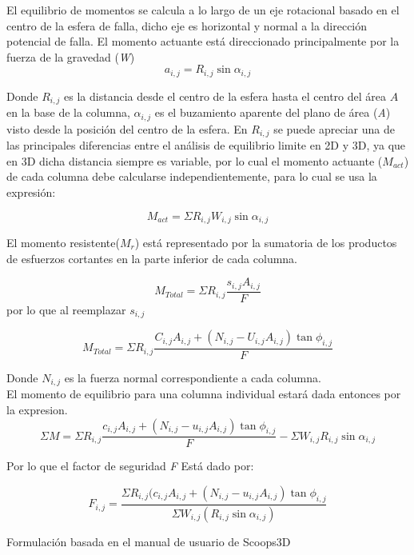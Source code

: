 El equilibrio de momentos se calcula a lo largo de un eje rotacional basado en el centro de la esfera de falla, dicho eje es horizontal y normal a la direcci\'on potencial de falla.
El momento actuante est\'a direccionado principalmente por la fuerza de la gravedad (\textit{W})
$$a_{i,j}=R_{i,j}\sin \alpha_{i,j}$$ 

Donde $\textit{R}_{i,j}$ es la distancia desde el centro de la esfera hasta el centro del \'area $\textit{A}$ en la base de la columna, $\alpha_{i,j}$ es el buzamiento aparente del plano de \'area (\textit{A}) visto desde la posici\'on del centro de la esfera. En $\textit{R}_{i,j}$ se puede apreciar una de las principales diferencias entre el an\'alisis de equilibrio limite en 2D y 3D, ya que en 3D dicha distancia siempre es variable, por lo cual el momento actuante ($\textit{M}_{act}$) de cada columna debe calcularse independientemente, para lo cual se usa la expresi\'on:

$$\textit{M}_{act}=\Sigma \textit{R}_{i,j}\textit{W}_{i,j}\sin\alpha_{i,j}  $$

El momento resistente($\textit{M}_{r}$)  est\'a representado por la sumatoria de los productos de esfuerzos cortantes en la parte inferior de cada columna.

$$\textit{M}_{Total}= \Sigma \textit{R}_{i,j}\frac{\textit{s}_{i,j}\textit{A}_{i,j}}{\textit{F}}  $$
por lo que al reemplazar $\textit{s}_{i,j}$ 

$$ {M}_{Total} = \Sigma \textit{R}_{i,j} \frac{\textit{C}_{i,j}\textit{A}_{i,j}+(\textit{N}_{i,j}-\textit{U}_{i,j}\textit{A}_{i,j})\tan\phi_{i,j}}{\textit{F}} $$

Donde $\textit{N}_{i,j}$ es la fuerza normal correspondiente a cada columna.\\

El momento de equilibrio para una columna individual estar\'a dada entonces por la expresion.
$$ \Sigma \textit{M}= \Sigma \textit{R}_{i,j} \frac{\textit{c}_{i,j}\textit{A}_{i,j}+(\textit{N}_{i,j}-\textit{u}_{i,j}\textit{A}_{i,j})\tan\phi _{i,j}}{F}-\Sigma \textit{W}_{i,j}\textit{R}_{i,j}\sin \alpha _{i,j} $$

Por lo que el factor de seguridad \textit{F} Est\'a dado por:

$$\textit{F}_{i,j}=  \frac{\Sigma \textit{R}_{i,j}(\textit{c}_{i,j}\textit{A}_{i,j}+(\textit{N}_{i,j}-\textit{u}_{i,j}\textit{A}_{i,j})\tan \phi _{i,j}}{\Sigma \textit{W} _{i,j}(\textit{R} _{i,j}\sin\alpha _{i,j})}  $$

Formulaci\'on basada en el manual de usuario de Scoops3D  \cite{formulas}

